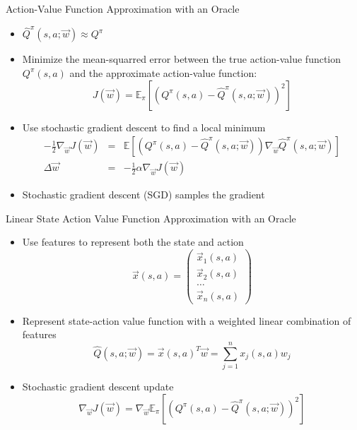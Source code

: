 \begin{frame}[c]{Action-Value Function Approximation with an Oracle}
	
	\begin{itemize}
		\item $\hat{Q}^\pi(s,a;\vec{w}) \approx Q^\pi$
		\item Minimize the mean-squarred error between the true action-value function $Q^\pi(s,a)$ and the approximate action-value function:
		$$J(\vec{w}) = \mathbb{E}_\pi [(Q^\pi(s,a) - \hat{Q}^\pi(s,a;\vec{w}))^2] $$
		\item Use stochastic gradient descent to find a local minimum
		\begin{eqnarray}
			-\frac{1}{2}\nabla_\vec{w} J(\vec{w}) &=& \mathbb{E}\left[ (Q^\pi(s,a) - \hat{Q}^\pi(s,a;\vec{w})) \nabla_\vec{w} \hat{Q}^\pi(s,a;\vec{w}) \right]\nonumber\\
			\Delta \vec{w} &=& -\frac{1}{2}\alpha\nabla_\vec{w} J(\vec{w})\nonumber
		\end{eqnarray}
		\item Stochastic gradient descent (SGD) samples the gradient
	\end{itemize}
	
\end{frame}
\begin{frame}[c]{Linear State Action Value Function Approximation with an
		Oracle}
	
	\begin{itemize}
		\item Use features to represent both the state and action
		$$\vec{x}(s,a) = \begin{pmatrix}
		\vec{x}_1(s,a)\\
		\vec{x}_2(s,a)\\
		\ldots\\
		\vec{x}_n(s,a)
		\end{pmatrix} $$
		\item Represent state-action value function with a weighted linear
		combination of features
		$$\hat{Q}(s,a;\vec{w}) = \vec{x}(s,a)^T \vec{w} = \sum_{j=1}^n x_j(s,a)w_j $$
		\item Stochastic gradient descent update
		$$\nabla_{\vec{w}} J(\vec{w}) = \nabla_{\vec{w}} \mathbb{E}_\pi [(Q^\pi(s,a) - \hat{Q}^\pi(s,a;\vec{w}))^2] $$
	\end{itemize}
	
\end{frame}
